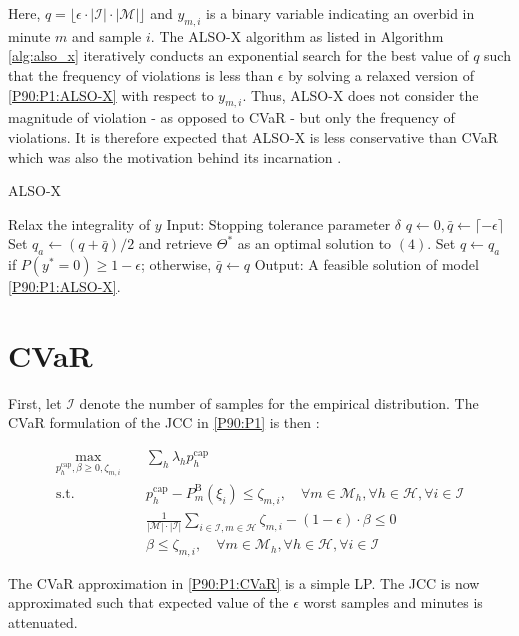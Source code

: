\documentclass{report}
\begin{document}
Here, $q = \lfloor  \epsilon \cdot |\mathcal{I}|  \cdot |\mathcal{M}| \rfloor $ and $y_{m,i}$ is a binary variable indicating an overbid in minute $m$ and sample $i$. The ALSO-X algorithm as listed in Algorithm \ref{alg:also_x} iteratively conducts an exponential search for the best value of $q$ such that the frequency of violations is less than $\epsilon$ by solving a relaxed version of \eqref{P90:P1:ALSO-X} with respect to $y_{m,i}$. Thus, ALSO-X does not consider the magnitude of violation - as opposed to CVaR - but only the frequency of violations. It is therefore expected that ALSO-X is less conservative than CVaR which was also the motivation behind its incarnation \cite{jiang2022also}.

\begin{algorithm}
    \caption{ALSO-X}
    \label{alg:also_x} %
    \begin{algorithmic}[1]
        \Require Relax the integrality of $y$
        Input: Stopping tolerance parameter $ \delta $
        \State$ q \leftarrow 0, \bar{q} \leftarrow \lceil -\epsilon \rceil $
        \State Set $ q_a \leftarrow (q + \bar{q})/2 $ and retrieve $ \Theta^* $ as an optimal solution to $ (4) $.
        \State Set $ q \leftarrow q_a $ if $ P(y^* = 0) \geq 1 - \epsilon $; otherwise, $ \bar{q} \leftarrow q $
        \EndWhile
        Output: A feasible solution of model \eqref{P90:P1:ALSO-X}.
    \end{algorithmic}
\end{algorithm}

\section*{CVaR}

First, let $\mathcal{I}$ denote the number of samples for the empirical distribution. The CVaR formulation of the JCC in \eqref{P90:P1} is then \cite{jiang2022also}:

\begin{align}\label{P90:P1:CVaR}
    \max_{p_{h}^{\text{cap}}, \beta \geq 0, \zeta_{m,i}} \quad & \sum_h \lambda_h p_{h}^{\text{cap}}                                                                                                                          \\
    \text{s.t.} \quad                                          & p_{h}^{\text{cap}} - P_{m}^{\text{B}}(\xi_i) \leq \zeta_{m,i}, \quad \forall{m} \in \mathcal{M}_{h},  \forall{h} \in \mathcal{H}, \forall{i} \in \mathcal{I} \\
                                                               & \frac{1}{|\mathcal{M}|\cdot |\mathcal{I}|} \sum_{i \in \mathcal{I}, m \in \mathcal{H}} \zeta_{m,i} - (1-\epsilon)\cdot \beta \leq 0                          \\
                                                               & \beta \leq  \zeta_{m,i}, \quad  \forall{m} \in \mathcal{M}_{h},  \forall{h} \in \mathcal{H}, \forall{i} \in \mathcal{I}
\end{align}

The CVaR approximation in \eqref{P90:P1:CVaR} is a simple LP. The JCC is now approximated such that expected value of the $\epsilon$ worst samples and minutes is attenuated.

\printbibliography
\end{document}

